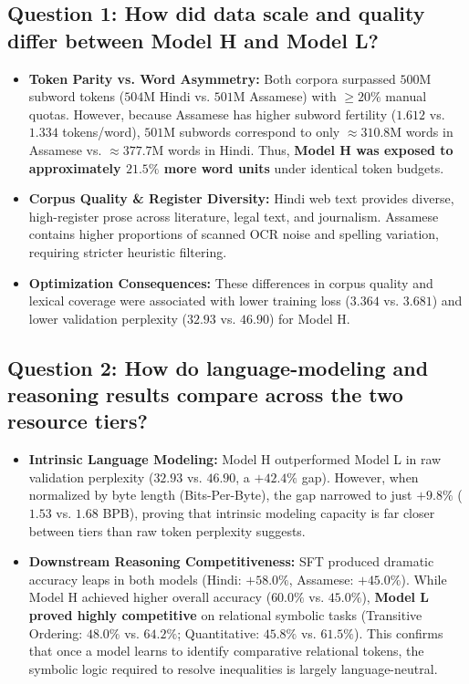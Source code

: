 \documentclass[11pt,a4paper]{article}
\begin{document}
\subsection{Question 1: How did data scale and quality differ between Model H and Model L?}
\begin{itemize}[noitemsep]
    \item \textbf{Token Parity vs. Word Asymmetry:} Both corpora surpassed $500\text{M}$ subword tokens ($504\text{M}$ Hindi vs. $501\text{M}$ Assamese) with $\ge 20\%$ manual quotas. However, because Assamese has higher subword fertility ($1.612$ vs. $1.334$ tokens/word), $501\text{M}$ subwords correspond to only $\approx 310.8\text{M}$ words in Assamese vs. $\approx 377.7\text{M}$ words in Hindi. Thus, \textbf{Model H was exposed to approximately $21.5\%$ more word units} under identical token budgets.

    \item \textbf{Corpus Quality \& Register Diversity:} Hindi web text provides diverse, high-register prose across literature, legal text, and journalism. Assamese contains higher proportions of scanned OCR noise and spelling variation, requiring stricter heuristic filtering.

    \item \textbf{Optimization Consequences:} These differences in corpus quality and lexical coverage were associated with lower training loss ($3.364$ vs. $3.681$) and lower validation perplexity ($32.93$ vs. $46.90$) for Model H.
\end{itemize}

\subsection{Question 2: How do language-modeling and reasoning results compare across the two resource tiers?}
\begin{itemize}[noitemsep]
    \item \textbf{Intrinsic Language Modeling:} Model H outperformed Model L in raw validation perplexity ($32.93$ vs. $46.90$, a $+42.4\%$ gap). However, when normalized by byte length (Bits-Per-Byte), the gap narrowed to just $+9.8\%$ ($1.53$ vs. $1.68$ BPB), proving that intrinsic modeling capacity is far closer between tiers than raw token perplexity suggests.
    \item \textbf{Downstream Reasoning Competitiveness:} SFT produced dramatic accuracy leaps in both models (Hindi: $+58.0\%$, Assamese: $+45.0\%$). While Model H achieved higher overall accuracy ($60.0\%$ vs. $45.0\%$), \textbf{Model L proved highly competitive} on relational symbolic tasks (Transitive Ordering: $48.0\%$ vs. $64.2\%$; Quantitative: $45.8\%$ vs. $61.5\%$). This confirms that once a model learns to identify comparative relational tokens, the symbolic logic required to resolve inequalities is largely language-neutral.
\end{itemize}
\end{document}
